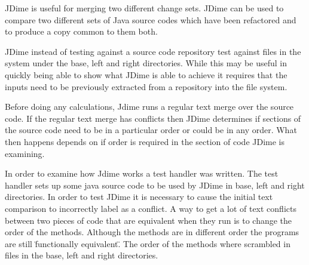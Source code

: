 JDime is useful for merging two different change sets. 
JDime can be used to compare two different sets of Java source codes which have been refactored and to produce a copy common to them both.  

JDime instead of testing against a source code repository test against files in the system under the base, left and right directories.
While this may be useful in quickly being able to show what JDime is able to achieve it requires that the inputs need to be previously extracted from a repository into the file system.

Before doing any calculations, Jdime runs a regular text merge over the source code.  
If the regular text merge has conflicts then JDime determines if sections of the source code need to be in a particular order or could be in any order.
What then happens depends on if order is required in the section of code JDime is examining.

In order to examine how Jdime works a test handler was written.
The test handler sets up some java source code to be used by JDime in base, left and right directories.
In order to test JDime it is necessary to cause the initial text comparison to incorrectly label as a conflict.
A way to get a lot of text conflicts between two pieces of code that are equivalent when they run is to change the order of the methods.
Although the methods are in different order the programs are still \"functionally equivalent\".
The order of the methods where scrambled in files in the base, left and right directories.





 







 
 


